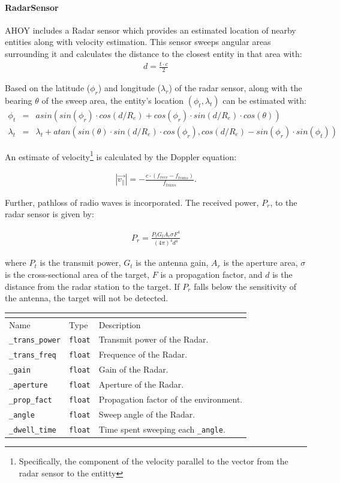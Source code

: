 \documentclass[titlepage]{article}
\newcommand{\attributes}[1]{
    \begin{center}
        \begin{tabular}{|p{3cm}|p{3cm}|p{8cm}|}
            \multicolumn{3}{|l|}{\cellcolor[gray]{0.5}{\textbf{Attributes}}} \\ \hline
            \rowcolor[gray]{0.8} Name & Type & Description \\ \hline 
            #1
        \end{tabular}
    \end{center}
}
\newcommand{\attribute}[3]{
    \texttt{#1} & \texttt{#2} & #3 \\ \hline
}
\begin{document}
\paragraph{RadarSensor}{AHOY includes a Radar sensor which provides an estimated location of nearby entities along with velocity estimation.  This sensor sweeps angular areas surrounding it and calculates the distance to the closest entity in that area with:
\begin{align*}
    d = \frac{t \cdot c}{2}
\end{align*}

Based on the latitude ($\phi_r$) and longitude ($\lambda_r$) of the radar sensor, along with the bearing $\theta$ of the sweep area, the entity's location $\left(\phi_t, \lambda_t\right)$ can be estimated with:
\begin{align*}
    \phi_t &=& asin\left(sin\left(\phi_r\right) \cdot cos\left(d/R_{e}\right) + cos\left(\phi_r\right) \cdot sin\left(d/R_{e}\right) \cdot cos\left(\theta\right)\right) \\ 
    \lambda_t &=& \lambda_t + atan\left(sin\left(\theta\right) \cdot sin\left(d/R_{e}\right) \cdot cos\left(\phi_r\right), cos\left(d/R_{e}\right)-sin\left(\phi_r\right) \cdot sin\left(\phi_t\right)\right)
\end{align*}

An estimate of velocity\footnote{Specifically, the component of the velocity parallel to the vector from the radar sensor to the entitty} is calculated by the Doppler equation:

\begin{align*}
    \left|\vec{v_{\parallel}}\right| = -\frac{c \cdot \left(f_{recv} - f_{trans}\right)}{f_{trans}}.
\end{align*}

Further, pathloss of radio waves is incorporated. The received power, $P_r$, to the radar sensor is given by:

\begin{align*}
    P_r = \frac{P_t G_t A_r \sigma F^4}{\left(4 \pi\right)^4 d^4}
\end{align*}

where $P_t$ is the transmit power, $G_t$ is the antenna gain, $A_r$ is the aperture area, $\sigma$ is the cross-sectional area of the target, $F$ is a propagation factor, and $d$ is the distance from the radar station to the target.  If $P_r$ falls below the sensitivity of the antenna, the target will not be detected.
}

\attributes
{
    \attribute{\_trans\_power}{float}{Transmit power of the Radar.}
    \attribute{\_trans\_freq}{float}{Frequence of the Radar.}
    \attribute{\_gain}{float}{Gain of the Radar.}
    \attribute{\_aperture}{float}{Aperture of the Radar.}
    \attribute{\_prop\_fact}{float}{Propagation factor of the environment.}
    \attribute{\_angle}{float}{Sweep angle of the Radar.}
    \attribute{\_dwell\_time}{float}{Time spent sweeping each \texttt{\_angle}.}
}
\end{document}
